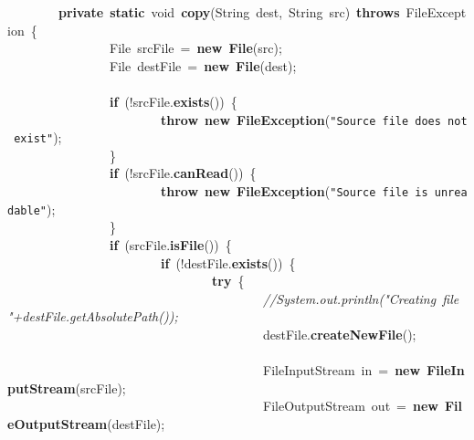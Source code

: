 \mbox{}\ \ \ \ \ \ \ \ \textbf{private}\ \textbf{static}\ void\ \textbf{copy}(String\ dest,\ String\ src)\ \textbf{throws}\ FileException\ \{ \\
\mbox{}\ \ \ \ \ \ \ \ \ \ \ \ \ \ \ \ File\ srcFile\ =\ \textbf{new}\ \textbf{File}(src); \\
\mbox{}\ \ \ \ \ \ \ \ \ \ \ \ \ \ \ \ File\ destFile\ =\ \textbf{new}\ \textbf{File}(dest); \\
\mbox{} \\
\mbox{}\ \ \ \ \ \ \ \ \ \ \ \ \ \ \ \ \textbf{if}\ (!srcFile.\textbf{exists}())\ \{ \\
\mbox{}\ \ \ \ \ \ \ \ \ \ \ \ \ \ \ \ \ \ \ \ \ \ \ \ \textbf{throw}\ \textbf{new}\ \textbf{FileException}(\texttt{"{}Source\ file\ does\ not\ exist"{}}); \\
\mbox{}\ \ \ \ \ \ \ \ \ \ \ \ \ \ \ \ \} \\
\mbox{}\ \ \ \ \ \ \ \ \ \ \ \ \ \ \ \ \textbf{if}\ (!srcFile.\textbf{canRead}())\ \{ \\
\mbox{}\ \ \ \ \ \ \ \ \ \ \ \ \ \ \ \ \ \ \ \ \ \ \ \ \textbf{throw}\ \textbf{new}\ \textbf{FileException}(\texttt{"{}Source\ file\ is\ unreadable"{}}); \\
\mbox{}\ \ \ \ \ \ \ \ \ \ \ \ \ \ \ \ \} \\
\mbox{}\ \ \ \ \ \ \ \ \ \ \ \ \ \ \ \ \textbf{if}\ (srcFile.\textbf{isFile}())\ \{ \\
\mbox{}\ \ \ \ \ \ \ \ \ \ \ \ \ \ \ \ \ \ \ \ \ \ \ \ \textbf{if}\ (!destFile.\textbf{exists}())\ \{ \\
\mbox{}\ \ \ \ \ \ \ \ \ \ \ \ \ \ \ \ \ \ \ \ \ \ \ \ \ \ \ \ \ \ \ \ \textbf{try}\ \{ \\
\mbox{}\ \ \ \ \ \ \ \ \ \ \ \ \ \ \ \ \ \ \ \ \ \ \ \ \ \ \ \ \ \ \ \ \ \ \ \ \ \ \ \ \textit{//System.out.println("{}Creating\ file\ "{}+destFile.getAbsolutePath());} \\
\mbox{}\ \ \ \ \ \ \ \ \ \ \ \ \ \ \ \ \ \ \ \ \ \ \ \ \ \ \ \ \ \ \ \ \ \ \ \ \ \ \ \ destFile.\textbf{createNewFile}(); \\
\mbox{}\ \ \ \ \ \ \ \ \ \ \ \ \ \ \ \ \ \ \ \ \ \ \ \ \ \ \ \ \ \ \ \ \ \ \ \ \ \ \ \  \\
\mbox{}\ \ \ \ \ \ \ \ \ \ \ \ \ \ \ \ \ \ \ \ \ \ \ \ \ \ \ \ \ \ \ \ \ \ \ \ \ \ \ \ FileInputStream\ in\ =\ \textbf{new}\ \textbf{FileInputStream}(srcFile); \\
\mbox{}\ \ \ \ \ \ \ \ \ \ \ \ \ \ \ \ \ \ \ \ \ \ \ \ \ \ \ \ \ \ \ \ \ \ \ \ \ \ \ \ FileOutputStream\ out\ =\ \textbf{new}\ \textbf{FileOutputStream}(destFile); \\
